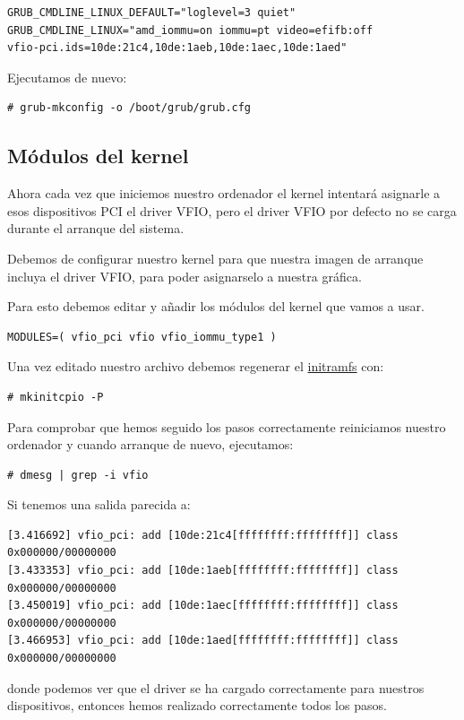 \documentclass[11pt]{article}
\begin{document}
\begin{verbatim}
GRUB_CMDLINE_LINUX_DEFAULT="loglevel=3 quiet"
GRUB_CMDLINE_LINUX="amd_iommu=on iommu=pt video=efifb:off
vfio-pci.ids=10de:21c4,10de:1aeb,10de:1aec,10de:1aed"
\end{verbatim}

Ejecutamos de nuevo:
\begin{verbatim}
# grub-mkconfig -o /boot/grub/grub.cfg
\end{verbatim}

\subsection{Módulos del kernel}

Ahora cada vez que iniciemos nuestro ordenador el kernel intentará asignarle a esos dispositivos PCI el driver VFIO, pero el driver VFIO por defecto no se carga durante el arranque del sistema.

\medskip
Debemos de configurar nuestro kernel para que nuestra imagen de arranque incluya el driver VFIO, para poder asignarselo a nuestra gráfica.

\medskip
Para esto debemos editar  y añadir los módulos del kernel que vamos a usar.

\begin{verbatim}
MODULES=( vfio_pci vfio vfio_iommu_type1 )
\end{verbatim}

Una vez editado nuestro archivo debemos regenerar el \href{https://en.wikipedia.org/wiki/Initial\_ramdisk}{initramfs} con:
\begin{verbatim}
# mkinitcpio -P
\end{verbatim}

Para comprobar que hemos seguido los pasos correctamente reiniciamos nuestro ordenador y cuando arranque de nuevo, ejecutamos:
\begin{verbatim}
# dmesg | grep -i vfio
\end{verbatim}

Si tenemos una salida parecida a:
\begin{lstlisting}[basicstyle=\small\ttfamily]
[3.416692] vfio_pci: add [10de:21c4[ffffffff:ffffffff]] class 0x000000/00000000
[3.433353] vfio_pci: add [10de:1aeb[ffffffff:ffffffff]] class 0x000000/00000000
[3.450019] vfio_pci: add [10de:1aec[ffffffff:ffffffff]] class 0x000000/00000000
[3.466953] vfio_pci: add [10de:1aed[ffffffff:ffffffff]] class 0x000000/00000000
\end{lstlisting}
donde podemos ver que el driver  se ha cargado correctamente para nuestros dispositivos, entonces hemos realizado correctamente todos los pasos.
\end{document}
